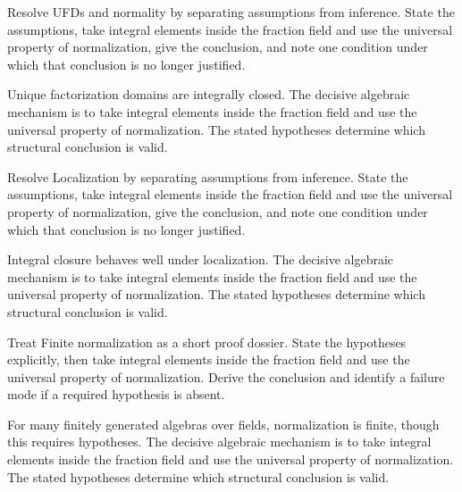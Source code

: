 \begin{problem}\label{prob:v20-problem-04}
Resolve UFDs and normality by separating assumptions from inference. State the assumptions, take integral elements inside the fraction field and use the universal property of normalization, give the conclusion, and note one condition under which that conclusion is no longer justified.
\end{problem}
\begin{solution}
Unique factorization domains are integrally closed. The decisive algebraic mechanism is to take integral elements inside the fraction field and use the universal property of normalization. The stated hypotheses determine which structural conclusion is valid.
\end{solution}

\begin{problem}\label{prob:v20-problem-05}
Resolve Localization by separating assumptions from inference. State the assumptions, take integral elements inside the fraction field and use the universal property of normalization, give the conclusion, and note one condition under which that conclusion is no longer justified.
\end{problem}
\begin{solution}
Integral closure behaves well under localization. The decisive algebraic mechanism is to take integral elements inside the fraction field and use the universal property of normalization. The stated hypotheses determine which structural conclusion is valid.
\end{solution}

\begin{problem}\label{prob:v20-problem-06}
Treat Finite normalization as a short proof dossier. State the hypotheses explicitly, then take integral elements inside the fraction field and use the universal property of normalization. Derive the conclusion and identify a failure mode if a required hypothesis is absent.
\end{problem}
\begin{solution}
For many finitely generated algebras over fields, normalization is finite, though this requires hypotheses. The decisive algebraic mechanism is to take integral elements inside the fraction field and use the universal property of normalization. The stated hypotheses determine which structural conclusion is valid.
\end{solution}

